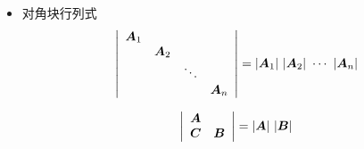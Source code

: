 \begin{frame}
  
    \begin{itemize}
    \item 对角块行列式
      $$
      \left|
      \begin{array}{cccc}
      \boldsymbol{A}_{1}&&&\\
      &\boldsymbol{A}_{2}&&\\
      &&\ddots&\\
      &&&\boldsymbol{A}_{n}        
      \end{array}
      \right|      
      =|\boldsymbol{A}_{1}|~|\boldsymbol{A}_{2}|~\cdots~|\boldsymbol{A}_{n}|
      $$      

      $$
      \left|
      \begin{array}{cc}
        \boldsymbol{A}&\\
        \boldsymbol{C}&\boldsymbol{B}
      \end{array}
      \right|=|\boldsymbol{A}|~|\boldsymbol{B}|
      $$
    \end{itemize}
  
\end{frame}


